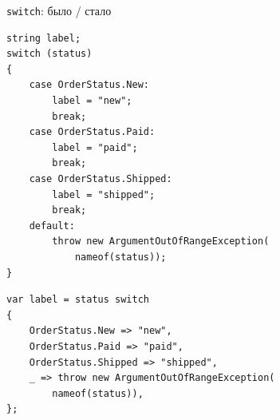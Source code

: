 \documentclass[aspectratio=169,10pt,t]{beamer}
\begin{document}
\begin{frame}[fragile]{\texttt{switch}: было / стало}
  \slidetop
  \begin{minipage}[t]{0.485\textwidth}
    \par\vspace{0.5em}
\begin{lstlisting}[style=csharp,basicstyle=\ttfamily\fontsize{6.4}{7.4}\selectfont]
string label;
switch (status)
{
    case OrderStatus.New:
        label = "new";
        break;
    case OrderStatus.Paid:
        label = "paid";
        break;
    case OrderStatus.Shipped:
        label = "shipped";
        break;
    default:
        throw new ArgumentOutOfRangeException(
            nameof(status));
}
\end{lstlisting}
  \end{minipage}\hfill
  \begin{minipage}[t]{0.485\textwidth}
    \par\vspace{0.5em}
\begin{lstlisting}[style=csharp,basicstyle=\ttfamily\fontsize{6.4}{7.4}\selectfont]
var label = status switch
{
    OrderStatus.New => "new",
    OrderStatus.Paid => "paid",
    OrderStatus.Shipped => "shipped",
    _ => throw new ArgumentOutOfRangeException(
        nameof(status)),
};
\end{lstlisting}
    \vspace{0.8em}
  \end{minipage}
\end{frame}
\end{document}

